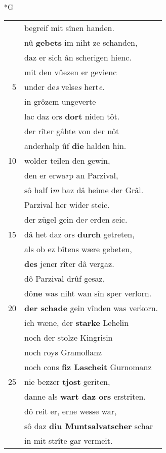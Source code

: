 \documentclass[8pt,a4paper,notitlepage]{article}
\begin{document}
\begin{table}[ht]
\begin{minipage}[t]{0.5\linewidth}
\small
\begin{center}*G
\end{center}
\begin{tabular}{rl}
 & begreif mit sînen handen.\\ 
 & nû \textbf{gebets} im niht ze schanden,\\ 
 & daz er sich ân scherigen hienc.\\ 
 & mit den vüezen er gevienc\\ 
5 & under  de\textit{s} velse\textit{s} hert\textit{e}.\\ 
 & in grôzem ungeverte\\ 
 & lac daz ors \textbf{dort} niden tôt.\\ 
 & der rîter gâhte von der nôt\\ 
 & anderhalp ûf \textbf{die} halden hin.\\ 
10 & wolder teilen den gewin,\\ 
 & den er erwa\textit{r}p an Parzival,\\ 
 & sô half i\textit{m} baz dâ heime der Grâl.\\ 
 & Parzival her wider steic.\\ 
 & der zügel gein de\textit{r} erden seic.\\ 
15 & dâ het daz ors \textbf{durch} getreten,\\ 
 & als ob ez bîtens wære gebeten,\\ 
 & \textbf{des} jener rîter dâ vergaz.\\ 
 & dô Parzival drûf gesaz,\\ 
 & dô\textbf{ne} was niht wan sîn sper verlorn.\\ 
20 & \textbf{der schade} gein vînden was verkorn.\\ 
 & ich wæne, der \textbf{starke} Lehelin\\ 
 & noch der stolze Kingrisin\\ 
 & noch roys Gramoflanz\\ 
 & noch cons \textbf{fiz Lascheit} Gurnomanz\\ 
25 & nie bezzer \textbf{tjost} geriten,\\ 
 & danne als \textbf{wart daz ors} erstriten.\\ 
 & dô reit er, erne wesse war,\\ 
 & sô daz \textbf{diu Muntsalvatscher} schar\\ 
 & in mit strîte gar vermeit.\\ 

\end{tabular}
\end{minipage}
\end{table}
\end{document}
